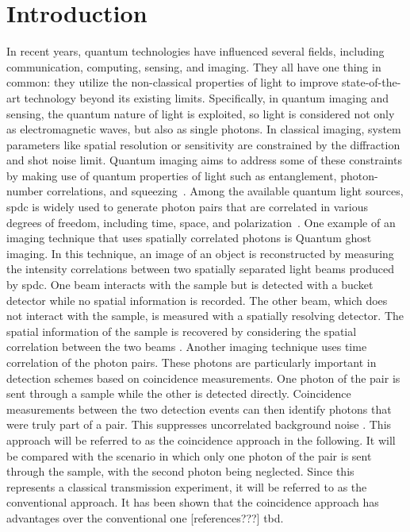 \section{Introduction}

In recent years, quantum technologies have influenced several fields, including communication, computing, sensing, and imaging. They all have one thing in common: they utilize the non-classical properties of light to improve state-of-the-art technology beyond its existing limits. \newline
Specifically, in quantum imaging and sensing, the quantum nature of light is exploited, so light is considered not only as electromagnetic waves, but also as single photons. \newline
In classical imaging, system parameters like spatial resolution or sensitivity are constrained by the diffraction and shot noise limit. 
Quantum imaging aims to address some of these constraints by making use of quantum properties of light such as entanglement, photon-number correlations, and squeezing~\cite{defienneAdvancesQuantumImaging2024,moreauImagingQuantumStates2019}. \newline
Among the available quantum light sources, \acrfull{spdc} is widely used to generate photon pairs that are correlated in various degrees of freedom, including time, space, and polarization~\cite{moreauImagingQuantumStates2019}. \newline
One example of an imaging technique that uses spatially correlated photons is Quantum ghost imaging. In this technique, an image of an object is reconstructed by measuring the intensity correlations between two spatially separated light beams produced by \acrshort{spdc}. One beam interacts with the sample but is detected with a bucket detector while no spatial information is recorded. The other beam, which does not interact with the sample, is measured with a spatially resolving detector. The spatial information of the sample is recovered by considering the spatial correlation between the two beams \cite{gilabertebassetPerspectivesApplicationsQuantum2019,lemosQuantumImagingUndetected2014}. \newline
Another imaging technique uses time correlation of the photon pairs.
These photons are particularly important in detection schemes based on coincidence measurements. One photon of the pair is sent through a sample while the other is detected directly. Coincidence measurements between the two detection events can then identify photons that were truly part of a pair. This suppresses uncorrelated background noise \cite{moreauImagingQuantumStates2019}. This approach will be referred to as the coincidence approach in the following. It will be compared with the scenario in which only one photon of the pair is sent through the sample, with the second photon being neglected. Since this represents a classical transmission experiment, it will be referred to as the conventional approach. It has been shown that the coincidence approach has advantages over the conventional one [references???] tbd. \newline
